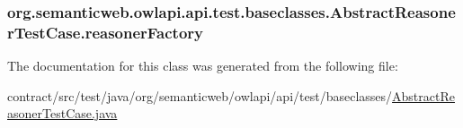 \hypertarget{classorg_1_1semanticweb_1_1owlapi_1_1api_1_1test_1_1baseclasses_1_1_abstract_reasoner_test_case_a9341f8cf9351feeaf9c9f3792ef09b70}{
\subsubsection[{reasoner\-Factory}]{ org.\-semanticweb.\-owlapi.\-api.\-test.\-baseclasses.\-Abstract\-Reasoner\-Test\-Case.\-reasoner\-Factory\hspace{0.3cm}{\ttfamily [private]}}}\label{classorg_1_1semanticweb_1_1owlapi_1_1api_1_1test_1_1baseclasses_1_1_abstract_reasoner_test_case_a9341f8cf9351feeaf9c9f3792ef09b70}


The documentation for this class was generated from the following file\-:\begin{DoxyCompactItemize}
\item 
contract/src/test/java/org/semanticweb/owlapi/api/test/baseclasses/\hyperlink{_abstract_reasoner_test_case_8java}{Abstract\-Reasoner\-Test\-Case.\-java}\end{DoxyCompactItemize}
